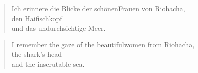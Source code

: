 \clearpage

\begin{verse}

Ich erinnere die Blicke der schönen\verselinebreak Frauen von Riohacha,\\
den Haifischkopf\\
und das undurchsichtige Meer.

\end{verse}

\clearpage

\begin{verse}

I remember the gaze of the beautiful\verselinebreak women from Riohacha,\\
the shark's head\\
and the inscrutable sea.

\end{verse}
